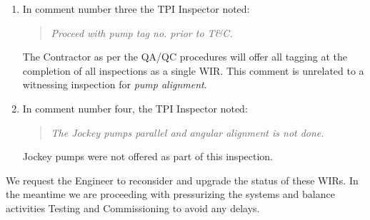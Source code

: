 \documentclass[a4paper,11pt,oneside]{article}
\def\signature{%
 \YL\encl}
\begin{document}
\begin{enumerate}
\item In comment number three the TPI Inspector noted:

\begin{quote}
\itshape Proceed with pump tag no. prior to T\&C.
\end{quote}

The Contractor as per the QA/QC procedures will offer all tagging at the completion of all inspections as a single WIR. This comment is unrelated to a witnessing inspection for \textit{pump alignment}. 

\item In comment number four, the TPI Inspector noted:

\begin{quote}
\itshape
The Jockey pumps parallel and angular alignment is not done.
\end{quote}

Jockey pumps were not offered as part of this inspection. 

\end{enumerate}



We request the Engineer to reconsider and upgrade the status of these WIRs. In the meantime we are proceeding with pressurizing the systems and balance activities Testing and Commissioning to avoid any delays.


\signature
\end{document}
